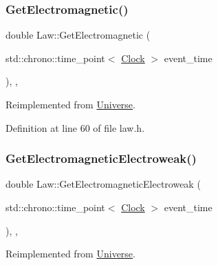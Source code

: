 \mbox{\label{class_law_a01eba6e68d2d8a717e2b4789be90853d}} 
\subsubsection{\texorpdfstring{Get\+Electromagnetic()}{GetElectromagnetic()}}
{\footnotesize\ttfamily double Law\+::\+Get\+Electromagnetic (\begin{DoxyParamCaption}\item[{std\+::chrono\+::time\+\_\+point$<$ \mbox{\hyperlink{universe_8h_a0ef8d951d1ca5ab3cfaf7ab4c7a6fd80}{Clock}} $>$}]{event\+\_\+time }\end{DoxyParamCaption})\hspace{0.3cm}{\ttfamily [inline]}, {\ttfamily [final]}, {\ttfamily [virtual]}}



Reimplemented from \mbox{\hyperlink{class_universe_a63b850ef3f3394313353109d222bf5d1}{Universe}}.



Definition at line 60 of file law.\+h.

\mbox{\label{class_law_ae4ccaca7b78905f416f35f9556b1923c}} 
\subsubsection{\texorpdfstring{Get\+Electromagnetic\+Electroweak()}{GetElectromagneticElectroweak()}}
{\footnotesize\ttfamily double Law\+::\+Get\+Electromagnetic\+Electroweak (\begin{DoxyParamCaption}\item[{std\+::chrono\+::time\+\_\+point$<$ \mbox{\hyperlink{universe_8h_a0ef8d951d1ca5ab3cfaf7ab4c7a6fd80}{Clock}} $>$}]{event\+\_\+time }\end{DoxyParamCaption})\hspace{0.3cm}{\ttfamily [inline]}, {\ttfamily [final]}, {\ttfamily [virtual]}}



Reimplemented from \mbox{\hyperlink{class_universe_a9f099605c082e7fa755787a6a8cab7ba}{Universe}}.



